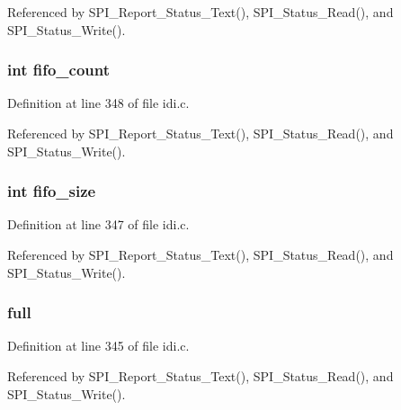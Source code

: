 Referenced by S\+P\+I\+\_\+\+Report\+\_\+\+Status\+\_\+\+Text(), S\+P\+I\+\_\+\+Status\+\_\+\+Read(), and S\+P\+I\+\_\+\+Status\+\_\+\+Write().

\hypertarget{structspi__status_a1515bdf17aa69c23285df7f9637ca30e}{
\subsubsection[{fifo\+\_\+count}]{\setlength{\rightskip}{0pt plus 5cm}int fifo\+\_\+count}}\label{structspi__status_a1515bdf17aa69c23285df7f9637ca30e}


Definition at line 348 of file idi.\+c.



Referenced by S\+P\+I\+\_\+\+Report\+\_\+\+Status\+\_\+\+Text(), S\+P\+I\+\_\+\+Status\+\_\+\+Read(), and S\+P\+I\+\_\+\+Status\+\_\+\+Write().

\hypertarget{structspi__status_a771649fbbbbf3161bbddd4d49db51552}{
\subsubsection[{fifo\+\_\+size}]{\setlength{\rightskip}{0pt plus 5cm}int fifo\+\_\+size}}\label{structspi__status_a771649fbbbbf3161bbddd4d49db51552}


Definition at line 347 of file idi.\+c.



Referenced by S\+P\+I\+\_\+\+Report\+\_\+\+Status\+\_\+\+Text(), S\+P\+I\+\_\+\+Status\+\_\+\+Read(), and S\+P\+I\+\_\+\+Status\+\_\+\+Write().

\hypertarget{structspi__status_a3b60b3c5cbe0736af58dccbde4e3161d}{
\subsubsection[{full}]{ full}}\label{structspi__status_a3b60b3c5cbe0736af58dccbde4e3161d}


Definition at line 345 of file idi.\+c.



Referenced by S\+P\+I\+\_\+\+Report\+\_\+\+Status\+\_\+\+Text(), S\+P\+I\+\_\+\+Status\+\_\+\+Read(), and S\+P\+I\+\_\+\+Status\+\_\+\+Write().


